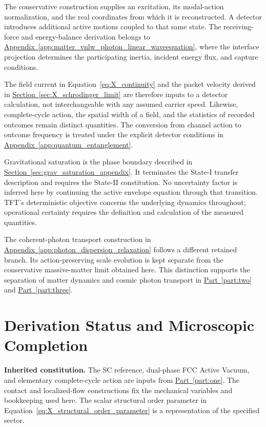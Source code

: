 The conservative construction supplies an excitation, its modal-action normalization, and the real coordinates from which it is reconstructed. A detector introduces additional active motions coupled to that same state. The receiving-force and energy-balance derivation belongs to \hyperref[app:matter_vnlw_photon_linear_waveequation]{Appendix~\ref*{app:matter_vnlw_photon_linear_waveequation}}, where the interface projection determines the participating inertia, incident energy flux, and capture conditions.

The field current in Equation~\eqref{eq:X_continuity} and the packet velocity derived in \hyperref[sec:X_schrodinger_limit]{Section~\ref*{sec:X_schrodinger_limit}} are therefore inputs to a detector calculation, not interchangeable with any assumed carrier speed. Likewise, complete-cycle action, the spatial width of a field, and the statistics of recorded outcomes remain distinct quantities. The conversion from channel action to outcome frequency is treated under the explicit detector conditions in \hyperref[app:quantum_entanglement]{Appendix~\ref*{app:quantum_entanglement}}.

Gravitational saturation is the phase boundary described in \hyperref[sec:grav_saturation_appendix]{Section~\ref*{sec:grav_saturation_appendix}}. It terminates the State-I transfer description and requires the State-II constitution. No uncertainty factor is inferred here by continuing the active envelope equation through that transition. TFT's deterministic objective concerns the underlying dynamics throughout; operational certainty requires the definition and calculation of the measured quantities.

The coherent-photon transport construction in \hyperref[app:photon_dispersion_relaxation]{Appendix~\ref*{app:photon_dispersion_relaxation}} follows a different retained branch. Its action-preserving scale evolution is kept separate from the conservative massive-matter limit obtained here. This distinction supports the separation of matter dynamics and cosmic photon transport in \hyperref[part:two]{Part~\ref*{part:two}} and \hyperref[part:three]{Part~\ref*{part:three}}.

\section{Derivation Status and Microscopic Completion}

\noindent\textbf{Inherited constitution.}
The SC reference, dual-phase FCC Active Vacuum, and elementary complete-cycle action are inputs from \hyperref[part:one]{Part~\ref*{part:one}}. The contact and localized-flow constructions fix the mechanical variables and bookkeeping used here. The scalar structural order parameter in Equation~\eqref{eq:X_structural_order_parameter} is a representation of the specified sector.

